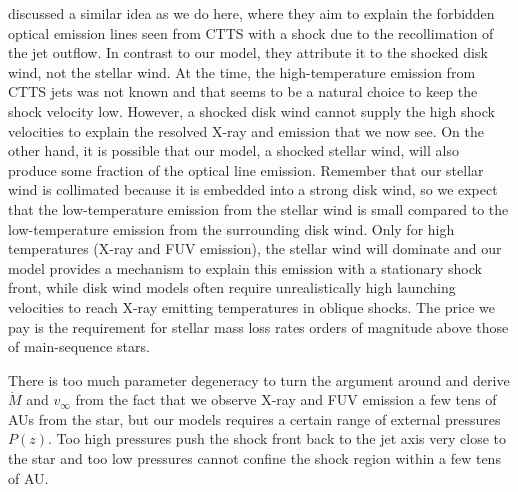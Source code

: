 \citet{1993ApJ...409..748G} discussed a similar idea as we do here, where they aim to explain the forbidden optical emission lines seen from CTTS with a shock due to the recollimation of the jet outflow. In contrast to our model, they attribute it to the shocked disk wind, not the stellar wind. At the time, the high-temperature emission from CTTS jets was not known and that seems to be a natural choice to keep the shock velocity low. However, a shocked disk wind cannot supply the high shock velocities to explain the resolved X-ray and  emission that we now see. On the other hand, it is possible that our model, a shocked stellar wind, will also produce some fraction of the optical line emission.
Remember that our stellar wind is collimated because it is embedded into a strong disk wind, so we expect that the low-temperature emission from the stellar wind is small compared to the low-temperature emission from the surrounding disk wind. Only for high temperatures (X-ray and FUV emission), the stellar wind will dominate and our model provides a mechanism to explain this emission with a stationary shock front, while disk wind models often require unrealistically high launching velocities to reach X-ray emitting temperatures in oblique shocks. The price we pay is the requirement for stellar mass loss rates orders of magnitude above those of main-sequence stars.

There is too much parameter degeneracy to turn the argument around and derive $\dot M$ and  $v_\infty$ from the fact that we observe X-ray and FUV emission a few tens of AUs from the star, but our models requires a certain range of external pressures $P(z)$. Too high pressures push the shock front back to the jet axis very close to the star and too low pressures cannot confine the shock region within a few tens of AU.


